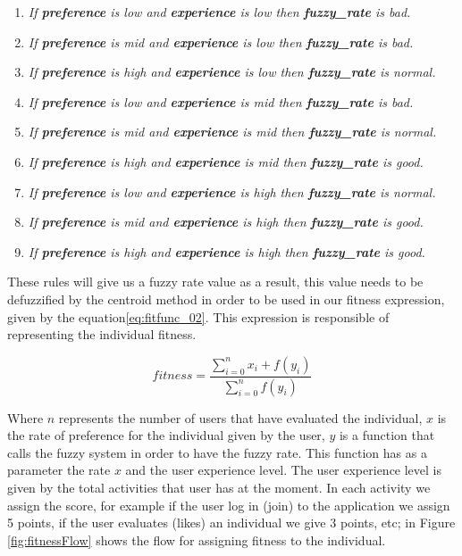 \begin{enumerate}
	\item \textit{If \textbf{preference} is low and
		\textbf{experience} is low then \textbf{fuzzy\_rate} is bad.}
	\item \textit{If \textbf{preference} is mid and
		\textbf{experience} is low then \textbf{fuzzy\_rate} is bad.}
	\item \textit{If \textbf{preference} is high and
		\textbf{experience} is low then \textbf{fuzzy\_rate} is normal.}
	\item \textit{If \textbf{preference} is low and
		\textbf{experience} is mid then \textbf{fuzzy\_rate} is bad.}
	\item \textit{If \textbf{preference} is mid and
		\textbf{experience} is mid then \textbf{fuzzy\_rate} is normal.}
	\item \textit{If \textbf{preference} is high and
		\textbf{experience} is mid then \textbf{fuzzy\_rate} is good.}
	\item \textit{If \textbf{preference} is low and
		\textbf{experience} is high then \textbf{fuzzy\_rate} is normal.}
	\item \textit{If \textbf{preference} is mid and
		\textbf{experience} is high then \textbf{fuzzy\_rate} is good.}
	\item \textit{If \textbf{preference} is high and
		\textbf{experience} is high then \textbf{fuzzy\_rate} is good.}

\end{enumerate}

These rules will give us a fuzzy rate value as a result, this value needs to
be defuzzified by the centroid method in order to be used in our fitness
expression, given by the equation\ref{eq:fitfunc_02}. This expression is responsible
of representing the individual fitness.

\begin{equation}\label{eq:fitfunc_02}
\displaystyle fitness=\frac{\sum_{i=0}^{n}x_{i}+f(y_{i})}{\sum_{i=0}^{n}f(y_{i})}
\end{equation}

Where $n$ represents the number of users that have evaluated the
individual, $x$ is the rate of preference for the individual given by the user,
$y$ is a function that calls the fuzzy system in order to have the fuzzy rate.
This function has as a parameter the rate $x$ and the user experience level.
The user experience level
is given by the total activities that user has at the moment. In each
activity we assign the score, for example if the user log in (join) to the
application we assign 5 points, if the user evaluates (likes) an individual we
give 3 points, etc; in Figure \ref{fig:fitnessFlow} shows the flow for assigning fitness to
the individual.

